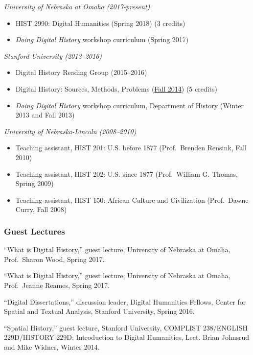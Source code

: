 \emph{University of Nebraska at Omaha (2017-present)}

\begin{itemize}
\tightlist
\item
  HIST 2990: Digital Humanities (Spring 2018) (3 credits)
\item
  \emph{Doing Digital History} workshop curriculum (Spring 2017)
\end{itemize}

\emph{Stanford University (2013--2016)}

\begin{itemize}
\tightlist
\item
  Digital History Reading Group (2015--2016)
\item
  Digital History: Sources, Methods, Problems
  (\href{http://jasonheppler.org/teaching/hist205f.2014/}{Fall 2014}) (5
  credits)
\item
  \emph{Doing Digital History} workshop curriculum, Department of
  History (Winter 2013 and Fall 2013)
\end{itemize}

\emph{University of Nebraska-Lincoln (2008--2010)}

\begin{itemize}
\tightlist
\item
  Teaching assistant, HIST 201: U.S. before 1877 (Prof.~Brenden Rensink,
  Fall 2010)
\item
  Teaching assistant, HIST 202: U.S. since 1877 (Prof.~William G.
  Thomas, Spring 2009)
\item
  Teaching assistant, HIST 150: African Culture and Civilization
  (Prof.~Dawne Curry, Fall 2008)
\end{itemize}

\subsubsection{Guest Lectures}\label{guest-lectures}

``What is Digital History,'' guest lecture, University of Nebraska at
Omaha, Prof.~Sharon Wood, Spring 2017.

``What is Digital History,'' guest lecture, University of Nebraska at
Omaha, Prof.~Jeanne Reames, Spring 2017.

``Digital Dissertations,'' discussion leader, Digital Humanities
Fellows, Center for Spatial and Textual Analysis, Stanford University,
Spring 2016.

``Spatial History,'' guest lecture, Stanford University, COMPLIST
238/ENGLISH 229D/HISTORY 229D: Introduction to Digital Humanities, Lect.
Brian Johnsrud and Mike Widner, Winter 2014.

